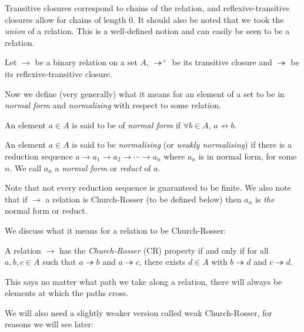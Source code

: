 \begin{remark}
    Transitive closures correspond to chains of the relation, and reflexive-transitive closures allow for chains of length $0$. It should also be noted that we took the \emph{union} of a relation. This is a well-defined notion and can easily be seen to be a relation.
\end{remark}

Let $\to$ be a binary relation on a set $A$, $\twoheadrightarrow^+$ be its transitive closure and $\twoheadrightarrow$ be its reflexive-transitive closure.

Now we define (very generally) what it means for an element of a set to be in \emph{normal form} and \emph{normalising} with respect to some relation.

\begin{defin}
    An element $a \in A$ is said to be of \emph{normal form} if $\forall b \in A$, $a {\not \to} b$.
\end{defin}

\begin{defin}
    An element $a \in A$ is said to be \emph{normalising} (or \emph{weakly normalising}) if there is a reduction sequence $a \to a_1 \to a_2 \to \cdots \to a_n$ where $a_n$ is in normal form, for some $n$. We call $a_n$ a \emph{normal form} or \emph{reduct} of $a$.
\end{defin}

\begin{remark}
    Note that not every reduction sequence is guaranteed to be finite. We also note that if $\to$ a relation is Church-Rosser (to be defined below) then $a_n$ is \emph{the} normal form or reduct.
\end{remark}

We discuss what it means for a relation to be Church-Rosser:

\begin{defin}
    A relation $\to$ has the \emph{Church-Rosser} (CR) property if and only if for all $a,b,c \in A$ such that $a \twoheadrightarrow b$ and $a \twoheadrightarrow c$, there exists $d \in A$ with $b \twoheadrightarrow d$ and $c \twoheadrightarrow d$.
\end{defin}

\begin{remark}
    This says no matter what path we take along a relation, there will always be elements at which the paths cross.
\end{remark}

We will also need a slightly weaker version called weak Church-Rosser, for reasons we will see later:

